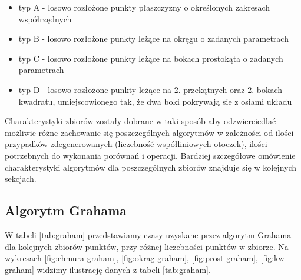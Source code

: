 \documentclass[11pt]{article}
\theoremstyle{remark} \newtheorem{definition}{def.}
\theoremstyle{definition} \newtheorem{twierdzenie}{tw.}
\begin{document}
\begin{itemize}
    \item   typ A - losowo rozłożone punkty płaszczyzny o określonych zakresach współrzędnych
    \item   typ B - losowo rozłożone punkty leżące na okręgu o zadanych parametrach
    \item   typ C - losowo rozłożone punkty leżące na bokach prostokąta o zadanych parametrach
    \item   typ D - losowo rozłożone punkty leżące na 2. przekątnych oraz 2. bokach kwadratu, umiejscowionego tak,
            że dwa boki pokrywają sie z osiami układu \\
\end{itemize}

Charakterystyki zbiorów zostały dobrane w taki sposób aby odzwierciedlać możliwie różne zachowanie się  poszczególnych algorytmów w zależności od ilości przypadków zdegenerowanych (liczebność 
współliniowych otoczek), ilości potrzebnych do wykonania porównań i operacji. Bardziej szczegółowe omówienie charakterystyki algorytmów dla poszczególnych zbiorów znajduje się w kolejnych sekcjach. 



\subsection{Algorytm Grahama}

W tabeli \ref{tab:graham} przedstawiamy czasy uzyskane przez algorytm Grahama dla kolejnych zbiorów punktów, przy różnej liczebności punktów w zbiorze. Na wykresach \ref{fig:chmura-graham}, 
\ref{fig:okrag-graham}, \ref{fig:prost-graham}, \ref{fig:kw-graham} widzimy ilustrację danych z tabeli \ref{tab:graham}.
\end{document}
